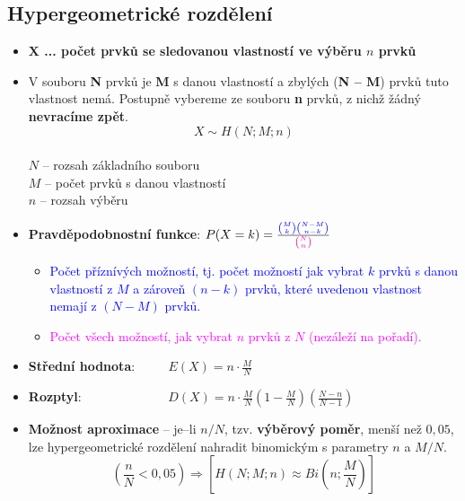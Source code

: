 \subsection{Hypergeometrické rozdělení}
\begin{itemize}
    \item \textbf{ $\mathbf{X}$ ... počet prvků se sledovanou vlastností ve výběru $n$ prvků}
    \item V souboru \textbf{N} prvků je \textbf{M} s danou vlastností a zbylých (\textbf{N -- M}) prvků tuto vlastnost nemá. Postupně vybereme ze souboru \textbf{n} prvků, z nichž žádný \textbf{nevracíme zpět}.
          $$X \sim H(N;M;n)$$ \\ $N$ -- rozsah základního souboru \\ $M$ -- počet prvků s danou vlastností \\ $n$ -- rozsah výběru
    \item \textbf{Pravděpodobnostní funkce}: $P(X = k) = \frac {\mathbin{\color{blue} \binom{M}{k} \binom{N-M}{n-k}}} {\mathbin{\color{magenta}\binom{N}{n}}}$
          \begin{itemize}
              \item \textcolor{blue}{Počet příznívých možností, tj. počet možností jak vybrat $k$ prvků s danou vlastností z $M$ a zároveň $(n-k)$ prvků, které uvedenou vlastnost nemají z $(N - M)$ prvků.}
              \item \textcolor{magenta}{Počet všech možností, jak vybrat $n$ prvků z $N$ (nezáleží na pořadí).}
          \end{itemize}
    \item \textbf{Střední hodnota}: $\qquad$ $E(X) = n \cdot \frac{M}{N}$
    \item \textbf{Rozptyl}: $\qquad\qquad\qquad\;\; D(X) = n \cdot \frac{M}{N}(1 - \frac{M}{N})(\frac{N-n}{N-1})$
    \item \textbf{Možnost aproximace} -- je--li $n/N$, tzv. \textbf{výběrový poměr}, menší než $0,05$, lze hypergeometrické rozdělení nahradit binomickým s parametry $n$ a $M/N$. $$(\frac{n}{N} < 0,05) \Rightarrow [H(N;M;n) \approx Bi(n;\frac{M}{N})]$$
\end{itemize}

